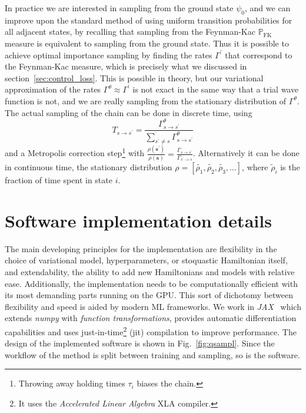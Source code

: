 In practice we are interested in sampling from the ground state $\psi_0$, and we can improve upon the standard method of using uniform transition probabilities for all adjacent states, by recalling that sampling from the Feynman-Kac $\mathbb{P}_\text{FK}$ measure is equivalent to sampling from the ground state. Thus it is possible to achieve optimal importance sampling by finding the rates $\Gamma^\prime$ that correspond to the Feynman-Kac measure, which is precisely what we discussed in section~\ref{sec:control_loss}. This is possible in theory, but our variational approximation of the rates $\Gamma^{\theta} \approx \Gamma^\prime$ is not exact in the same way that a trial wave function is not, and we are really sampling from the stationary distribution of $\Gamma^\theta$. The actual sampling of the chain can be done in discrete time, using
\begin{equation}
	T_{s \rightarrow s^{\prime}}=\frac{\Gamma_{s \rightarrow s^{\prime}}^{\theta}}{\sum_{s^{\prime} \neq s} \Gamma_{s \rightarrow s^{\prime}}^{\theta}}
\end{equation}
and a Metropolis correction step\footnote{Throwing away holding times $\tau_i$ biases the chain.} with ${\frac{\rho\left(\boldsymbol{s}^{\prime}\right)}{\rho(\boldsymbol{s})}} = \frac{\Gamma_{s \rightarrow s^{\prime}}}{\Gamma_{s^{\prime} \rightarrow s}}$. Alternatively it can be done in continuous time, the stationary distribution $\rho = \left[ \tilde{\rho_1}, \tilde{\rho_2}, \tilde{\rho_3}, \ldots \right]$, where $\tilde \rho_i$ is the fraction of time spent in state $i$.

\section{Software implementation details}
\label{sec:qoptsampl}
The main developing principles for the implementation are flexibility in the choice of variational model, hyperparameters, or stoquastic Hamiltonian itself, and extendability, the ability to add new Hamiltonians and models with relative ease. Additionally, the implementation needs to be computationally efficient with its most demanding parts running on the GPU. This sort of dichotomy between flexibility and speed is aided by modern ML frameworks. We work in \emph{JAX}~\cite{jax2018github} which extends \emph{numpy} with \emph{function transformations}, provides automatic differentiation capabilities and uses just-in-time\footnote{It uses the \emph{Accelerated Linear Algebra} XLA compiler.} (jit) compilation to improve performance. The design of the implemented software is shown in Fig.~\ref{fig:qsampl}. Since the workflow of the method is split between training and sampling, so is the software.


